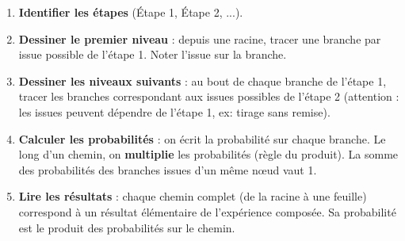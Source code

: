 \documentclass[11pt]{article}
\begin{document}
\begin{methode}
\begin{enumerate}
    \item \textbf{Identifier les étapes} (Étape 1, Étape 2, ...).
    \item \textbf{Dessiner le premier niveau} : depuis une racine, tracer une branche par issue possible de l'étape 1. Noter l'issue sur la branche.
    \item \textbf{Dessiner les niveaux suivants} : au bout de chaque branche de l'étape 1, tracer les branches correspondant aux issues possibles de l'étape 2 (attention : les issues peuvent dépendre de l'étape 1, ex: tirage sans remise).
    \item \textbf{Calculer les probabilités} : on écrit la probabilité sur chaque branche. Le long d'un chemin, on \textbf{multiplie} les probabilités (règle du produit). La somme des probabilités des branches issues d'un même nœud vaut 1.
    \item \textbf{Lire les résultats} : chaque chemin complet (de la racine à une feuille) correspond à un résultat élémentaire de l'expérience composée. Sa probabilité est le produit des probabilités sur le chemin.
\end{enumerate}
\end{methode}
\end{document}

